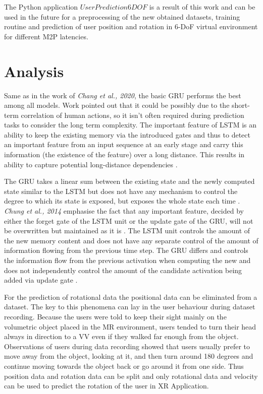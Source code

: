The Python application $UserPrediction6DOF$ is a result of this work and can be used in the future for a preprocessing of the new obtained datasets, training routine and prediction of user position and rotation in 6-DoF virtual environment for different M2P latencies. 

\section{Analysis}
\label{sec:conclusion:analysis}
Same as in the work of \textit{Chang et al., 2020}, the basic GRU performs the best among all models. Work \cite{6DoF_Tracking} pointed out that it could be possibly due to the short-term correlation of human actions, so it isn’t often required during prediction tasks to consider the long term complexity. The important feature of LSTM is an ability to keep the existing memory via the introduced gates and thus to detect an important feature from an input sequence at an early stage and carry this information (the existence of the feature) over a long distance. This results in ability to capture potential long-distance dependencies \cite{empirical_evaluation}. 

The GRU takes a linear sum between the existing state and the newly computed state similar to the LSTM but does not have any mechanism to control the degree to which its state is exposed, but exposes the whole state each time \cite{empirical_evaluation}. \textit{Chung et al., 2014} emphasise the fact that any important feature, decided by either the forget gate of the LSTM unit or the update gate of the GRU, will not be overwritten but maintained as it is \cite{empirical_evaluation}. The LSTM unit controls the amount of the new memory content and does not have any separate control of the amount of information flowing from the previous time step. The GRU differs and controls the information flow from the previous activation when computing the new and does not independently control the amount of the candidate activation being added via update gate \cite{empirical_evaluation}. 

For the prediction of rotational data the positional data can be eliminated from a dataset. The key to this phenomena can lay in the user behaviour during dataset recording. Because the users were told to keep their sight mainly on the volumetric object placed in the MR environment, users tended to turn their head always in direction to a VV even if they walked far enough from the object. Observations of users during data recording showed that users usually prefer to move away from the object, looking at it, and then turn around 180 degrees and continue moving towards the object back or go around it from one side. Thus position data and rotation data can be split and only rotational data and velocity can be used to predict the rotation of the user in XR Application.

